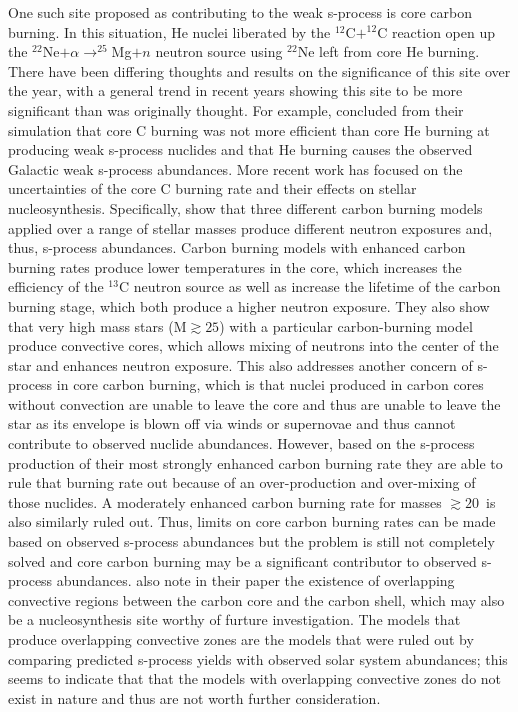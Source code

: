 One such site proposed as contributing to the weak s-process 
is core carbon burning.  In this situation, He nuclei liberated by the
$^{12}$C$+^{12}$C reaction open up the $^{22}$Ne$+ \alpha \rightarrow
^{25}$Mg$+n$ neutron source using $^{22}$Ne left from core He
burning. There have been differing thoughts and results on the
significance of this site over the year, with a general trend in
recent years showing this site to be more significant than was
originally thought.  For example, \cite{arcoragi1991} concluded from their
simulation that core C burning was not more efficient than core
He burning at producing weak s-process nuclides and that He burning
causes the observed Galactic weak s-process abundances.  More recent
work has focused on the uncertainties of the core C burning rate and
their effects on stellar nucleosynthesis.  Specifically, \cite{bennettetal2012}
show that three different carbon burning models applied over a range
of stellar masses produce different
neutron exposures and, thus, s-process abundances.  Carbon burning
models with enhanced carbon burning rates produce lower temperatures
in the core, which
increases the efficiency of the $^{13}$C
neutron source as well as increase the lifetime of the carbon burning
stage, which both produce a higher neutron exposure.  They also show that very
high mass stars (M$\gtrsim25$\Msol) with a particular carbon-burning
model produce convective cores, which allows mixing of neutrons into
the center of the star and enhances neutron exposure.  This also
addresses another concern of s-process in core carbon burning, which
is that nuclei produced in carbon cores without convection are unable
to leave the core and thus are unable to leave the star as its
envelope is blown off via winds or supernovae and thus cannot
contribute to observed nuclide abundances.  However, based on the
s-process production of their most strongly enhanced carbon burning
rate they are able to rule that burning rate out because of an
over-production and over-mixing of those nuclides.  A moderately enhanced carbon
burning rate for masses $\gtrsim 20$\Msol\ is also similarly ruled
out.  Thus, limits on core carbon burning rates can be made based on
observed s-process abundances but the problem is still not completely
solved and core carbon burning may be a significant contributor to
observed s-process abundances.  \cite{bennettetal2012} also note in 
their paper the
existence of overlapping convective regions between the carbon core
and the carbon shell, which may also be a nucleosynthesis site worthy
of furture investigation. The models that produce overlapping
convective zones are the models that were ruled out by comparing
predicted s-process yields with observed solar system abundances; this
seems to indicate that that the models with overlapping convective
zones do not exist in nature and thus are not worth further
consideration.

